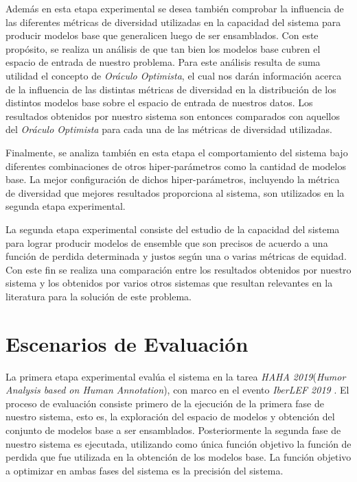 Además en esta etapa experimental se desea también comprobar la influencia de las diferentes métricas de diversidad utilizadas en la capacidad del sistema para producir modelos base que generalicen luego de ser ensamblados.
Con este propósito, se realiza un análisis de que tan bien los modelos base cubren el espacio de entrada de nuestro problema.
Para este análisis resulta de suma utilidad el concepto de \emph{Oráculo Optimista}, el cual nos darán información acerca de la influencia de las distintas métricas de diversidad en la distribución de los distintos modelos base sobre el espacio de entrada de nuestros datos.
Los resultados obtenidos por nuestro sistema son entonces comparados con aquellos del \emph{Oráculo Optimista} para cada una de las métricas de diversidad utilizadas.

Finalmente, se analiza también en esta etapa el comportamiento del sistema bajo diferentes combinaciones de otros hiper-parámetros como la cantidad de modelos base.
La mejor configuración de dichos hiper-parámetros, incluyendo la métrica de diversidad que mejores resultados proporciona al sistema, son utilizados en la segunda etapa experimental.

La segunda etapa experimental consiste del estudio de la capacidad del sistema para lograr producir modelos de ensemble que son precisos de acuerdo a una función de perdida determinada y justos según una o varias métricas de equidad. 
Con este fin se realiza una comparación entre los resultados obtenidos por nuestro sistema y los obtenidos por varios otros sistemas que resultan relevantes en la literatura para la solución de este problema.

\section{Escenarios de Evaluación}

La primera etapa experimental evalúa el sistema en la tarea \emph{HAHA 2019}(\textit{Humor Analysis based on Human Annotation}), con marco en el evento \textit{IberLEF 2019} \parencite{chiruzzo2019overview}.
El proceso de evaluación consiste primero de la ejecución de la primera fase de nuestro sistema, esto es, la exploración del espacio de modelos y obtención del conjunto de modelos base a ser ensamblados.
Posteriormente la segunda fase de nuestro sistema es ejecutada, utilizando como única función objetivo la función de perdida que fue utilizada en la obtención de los modelos base.
La función objetivo a optimizar en ambas fases del sistema es la precisión del sistema.

